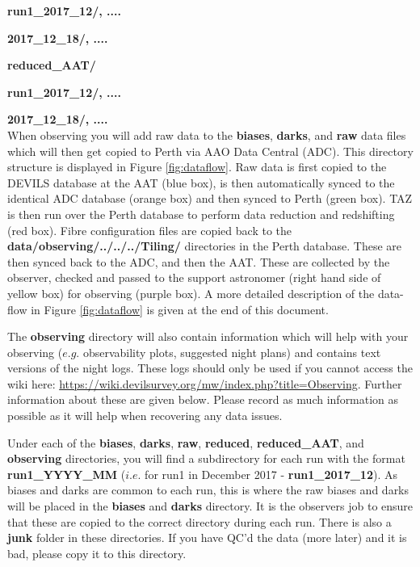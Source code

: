 \documentclass[12pt]{article}
\begin{document}
\hspace{15mm} \textbf{run1\_2017\_12/, ....} 
\vspace{1mm}

\hspace{30mm} \textbf{2017\_12\_18/, ....}
\vspace{1mm}

\hspace{10mm} \textbf{reduced\_AAT/}
\vspace{1mm}

\hspace{15mm} \textbf{run1\_2017\_12/, ....} 
\vspace{1mm}

\hspace{30mm} \textbf{2017\_12\_18/, ....} \\



When observing you will add raw data to the \textbf{biases},  \textbf{darks}, and \textbf{raw} data files which will then get copied to Perth via AAO Data Central (ADC). This directory structure is displayed in Figure \ref{fig:dataflow}. Raw data is first copied to the DEVILS database at the AAT (blue box), is then automatically synced to the identical ADC database (orange box) and then synced to Perth (green box). TAZ is then run over the Perth database to perform data reduction and redshifting (red box). Fibre configuration files are copied back to the \textbf{data/observing/../../../Tiling/}  directories in the Perth database. These are then synced back to the ADC, and then the AAT. These are collected by the observer, checked and passed to the support astronomer (right hand side of yellow box) for observing (purple box). A more detailed description of the data-flow in Figure \ref{fig:dataflow} is given at the end of this document.   

\vspace{2mm}

The \textbf{observing} directory will also contain information which will help with your observing ($e.g.$ observability plots, suggested night plans) and contains text versions of the night logs. These logs should only be used if you cannot access the wiki here:  \url{https://wiki.devilsurvey.org/mw/index.php?title=Observing}. Further information about these are given below. Please record as much information as possible as it will help when recovering any data issues. 

Under each of the \textbf{biases}, \textbf{darks}, \textbf{raw}, \textbf{reduced}, \textbf{reduced\_AAT},  and \textbf{observing} directories, you will find a subdirectory for each run with the format \textbf{run1\_YYYY\_MM} ($i.e.$ for run1 in December 2017 - \textbf{run1\_2017\_12}). As biases and darks are common to each run, this is where the raw biases and darks will be placed in the \textbf{biases} and \textbf{darks} directory. It is the observers job to ensure that these are copied to the correct directory during each run. There is also a \textbf{junk} folder in these directories. If you have QC'd the data (more later) and it is bad, please copy it to this directory. 
\end{document}
